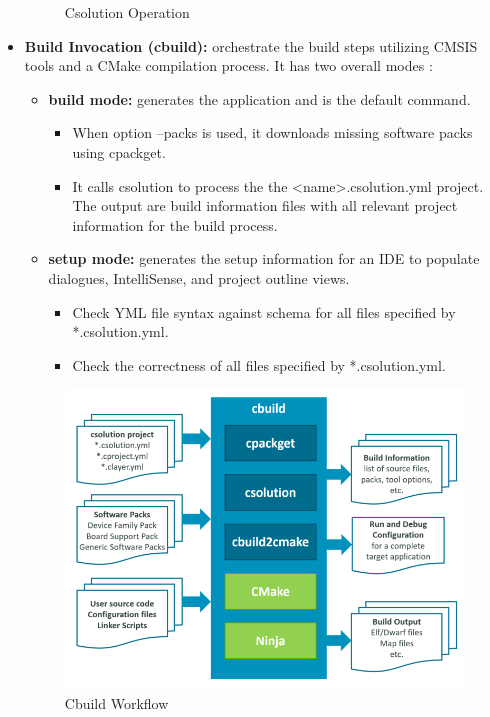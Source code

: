 \begin{itemize}
\begin{figure}[H]
		\caption{Csolution Operation}
		\label{fig:csolution_op}
	\end{figure}    
	\item \textbf{Build Invocation (cbuild):} orchestrate the build steps utilizing CMSIS tools and a CMake compilation process. It has two overall modes :
	\begin{itemize}
		\item \textbf{build mode:} generates the application and is the default command.
		\begin{itemize}
			\item When option --packs is used, it downloads missing software packs using cpackget.
			\item It calls csolution to process the the <name>.csolution.yml project. The output are build information files with all relevant project information for the build process.
		\end{itemize}
		\item  \textbf{setup mode:} generates the setup information for an IDE to populate dialogues, IntelliSense, and project outline views.
		\begin{itemize}
			\item Check YML file syntax against schema for all files specified by *.csolution.yml.
			\item Check the correctness of all files specified by *.csolution.yml.
		\end{itemize}
	\end{itemize}
	\begin{figure}[H]
		\centering
		\includegraphics[width=15cm]{img/ST_Summer_Internship/cbuild-workflow.png}
		\caption{Cbuild Workflow}
		\label{fig:cbuild_wf}
	\end{figure}
\end{itemize}
